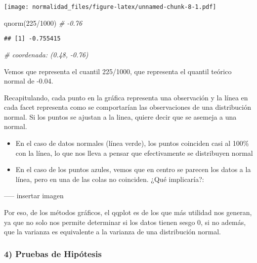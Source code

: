 \documentclass[
]{article}
\newenvironment{Shaded}{\begin{snugshade}}{\end{snugshade}}
\newcommand{\CommentTok}[1]{\textcolor[rgb]{0.56,0.35,0.01}{\textit{#1}}}
\newcommand{\DecValTok}[1]{\textcolor[rgb]{0.00,0.00,0.81}{#1}}
\newcommand{\FunctionTok}[1]{\textcolor[rgb]{0.00,0.00,0.00}{#1}}
\newcommand{\NormalTok}[1]{#1}
\newcommand{\SpecialCharTok}[1]{\textcolor[rgb]{0.00,0.00,0.00}{#1}}
\begin{document}
\texttt{[image: normalidad\_files/figure-latex/unnamed-chunk-8-1.pdf]}

\begin{Shaded}
\begin{Highlighting}[]
\FunctionTok{qnorm}\NormalTok{(}\DecValTok{225}\SpecialCharTok{/}\DecValTok{1000}\NormalTok{) }\CommentTok{\# {-}0.76}
\end{Highlighting}
\end{Shaded}

\begin{verbatim}
## [1] -0.755415
\end{verbatim}

\begin{Shaded}
\begin{Highlighting}[]
\CommentTok{\# coordenada: (0.48, {-}0.76)}
\end{Highlighting}
\end{Shaded}

Vemos que representa el cuantil 225/1000, que representa el quantil
teórico normal de -0.04.

Recapitulando, cada punto en la gráfica representa una observación y la
línea en cada facet representa como se comportarían las observaciones de
una distribución normal. Si los puntos se ajustan a la linea, quiere
decir que se asemeja a una normal.

\begin{itemize}
\item
  En el caso de datos normales (línea verde), los puntos coinciden casi
  al 100\% con la línea, lo que nos lleva a pensar que efectivamente se
  distribuyen normal
\item
  En el caso de los puntos azules, vemos que en centro se parecen los
  datos a la línea, pero en una de las colas no coinciden. ¿Qué
  implicaría?:
\end{itemize}

----- insertar imagen

Por eso, de los métodos gráficos, el qqplot es de los que más utilidad
nos generan, ya que no solo nos permite determinar si los datos tienen
sesgo 0, si no además, que la varianza es equivalente a la varianza de
una distribución normal.

\hypertarget{pruebas-de-hipuxf3tesis}{%
\subsubsection{4) Pruebas de Hipótesis}\label{pruebas-de-hipuxf3tesis}}
\end{document}
